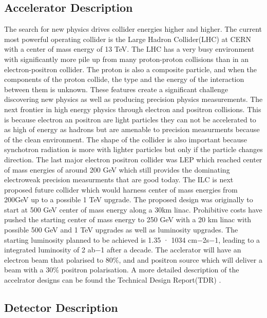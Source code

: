\subsection{Accelerator Description}
\label{ilc}


The search for new physics drives collider energies higher and higher. The current most powerful operating collider is the Large Hadron Collider(LHC) at CERN with a center of mass energy of 13 TeV. The LHC has a very busy environment with significantly more pile up from many proton-proton collisions than in an electron-positron collider. The proton is also a composite particle, and when the components of the proton collide, the type and the energy of the interaction between them is unknown. These features create a significant challenge discovering new physics as well as producing precision physics measurements. The next frontier in high energy physics through electron and positron collisions. This is because electron an positron are light particles they can not be accelerated to as high of energy as hadrons but are amenable to precision measurments because of the clean environment. The shape of the collider is also important because synchotron radiation is more with lighter particles but only if the particle changes direction.  The last major electron positron collider was LEP which reached center of mass energies of around 200 GeV which still provides the dominating electroweak precision measurments that are good today.  The ILC is next proposed future collider which would harness center of mass energies from 200GeV up to a possible 1 TeV upgrade.  The proposed design was originally to start at 500 GeV center of mass energy along a 30km linac. Prohibitive costs have pushed the starting center of mass energy to 250 GeV  with a 20 km linac with possible 500 GeV and 1 TeV upgrades as well as luminosity upgrades.  The starting luminosity planned to be achieved is 1.35 · 1034 cm−2s−1, leading to a integrated luminosity of  2 ab−1 after a decade. The acclerator will have an electron beam that 
polarised to $80\%$, and and positron source which will deliver a beam with a $30 \%$ positron polarisation.\cite{currdetector} A more detailed description of the accelrator designs can be found the Technical Design Report(TDR) \cite{TDR}.

\subsection{Detector Description}
\label{ild}

